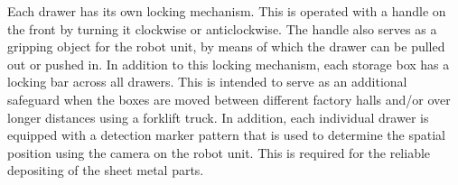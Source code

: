 Each drawer has its own locking mechanism. This is operated with a handle on the front by turning it
clockwise or anticlockwise. The handle also serves as a gripping object for the robot
unit, by means of which the drawer can be pulled out or pushed in. In addition to this locking mechanism,
each storage box has a locking bar across all drawers. This is intended to serve as an additional
safeguard when the boxes are moved between different factory halls and/or over longer distances
using a forklift truck. In addition, each individual drawer is equipped with a detection marker pattern that is
used to determine the spatial position using the camera on the robot unit. This is required
for the reliable depositing of the sheet metal parts.